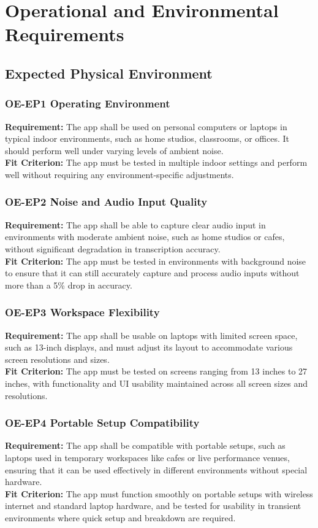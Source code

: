 \documentclass[12pt]{article}
\begin{document}
\section{Operational and Environmental Requirements}
\subsection{Expected Physical Environment}
\subsubsection*{OE-EP1 Operating Environment}
\textbf{Requirement:} The app shall be used on personal computers or laptops in typical indoor environments, such as home studios, classrooms, or offices. It should perform well under varying levels of ambient noise.\\
\textbf{Fit Criterion:} The app must be tested in multiple indoor settings and perform well without requiring any environment-specific adjustments.
\subsubsection*{OE-EP2 Noise and Audio Input Quality}
\textbf{Requirement:} The app shall be able to capture clear audio input in environments with moderate ambient noise, such as home studios or cafes, without significant degradation in transcription accuracy.\\
\textbf{Fit Criterion:} The app must be tested in environments with background noise to ensure that it can still accurately capture and process audio inputs without more than a 5\% drop in accuracy.
\subsubsection*{OE-EP3 Workspace Flexibility}
\textbf{Requirement:} The app shall be usable on laptops with limited screen space, such as 13-inch displays, and must adjust its layout to accommodate various screen resolutions and sizes.\\
\textbf{Fit Criterion:} The app must be tested on screens ranging from 13 inches to 27 inches, with functionality and UI usability maintained across all screen sizes and resolutions.
\subsubsection*{OE-EP4 Portable Setup Compatibility}
\textbf{Requirement:} The app shall be compatible with portable setups, such as laptops used in temporary workspaces like cafes or live performance venues, ensuring that it can be used effectively in different environments without special hardware.\\
\textbf{Fit Criterion:} The app must function smoothly on portable setups with wireless internet and standard laptop hardware, and be tested for usability in transient environments where quick setup and breakdown are required.
\end{document}
